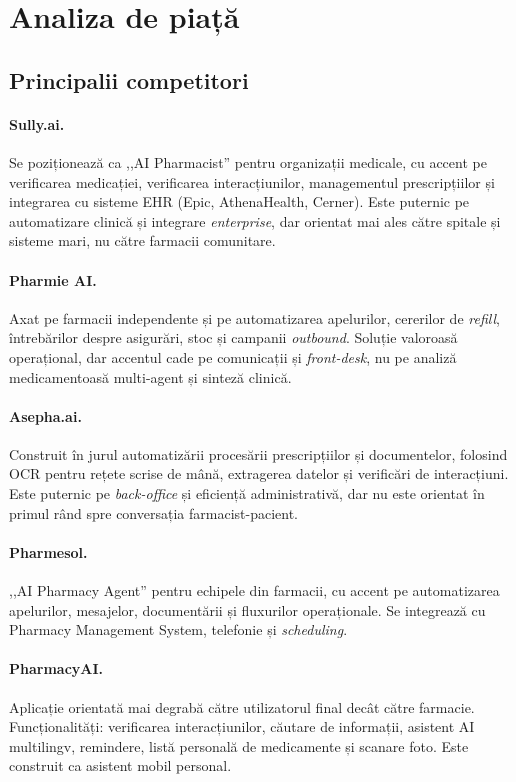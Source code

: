 \section{Analiza de piață}

\subsection{Principalii competitori}

\paragraph{Sully.ai.} Se poziționează ca ,,AI Pharmacist'' pentru organizații medicale, cu accent pe verificarea medicației, verificarea interacțiunilor, managementul prescripțiilor și integrarea cu sisteme EHR (Epic, AthenaHealth, Cerner). Este puternic pe automatizare clinică și integrare \textit{enterprise}, dar orientat mai ales către spitale și sisteme mari, nu către farmacii comunitare.

\paragraph{Pharmie AI.} Axat pe farmacii independente și pe automatizarea apelurilor, cererilor de \textit{refill}, întrebărilor despre asigurări, stoc și campanii \textit{outbound}. Soluție valoroasă operațional, dar accentul cade pe comunicații și \textit{front-desk}, nu pe analiză medicamentoasă multi-agent și sinteză clinică.

\paragraph{Asepha.ai.} Construit în jurul automatizării procesării prescripțiilor și documentelor, folosind OCR pentru rețete scrise de mână, extragerea datelor și verificări de interacțiuni. Este puternic pe \textit{back-office} și eficiență administrativă, dar nu este orientat în primul rând spre conversația farmacist-pacient.

\paragraph{Pharmesol.} ,,AI Pharmacy Agent'' pentru echipele din farmacii, cu accent pe automatizarea apelurilor, mesajelor, documentării și fluxurilor operaționale. Se integrează cu Pharmacy Management System, telefonie și \textit{scheduling}.

\paragraph{PharmacyAI.} Aplicație orientată mai degrabă către utilizatorul final decât către farmacie. Funcționalități: verificarea interacțiunilor, căutare de informații, asistent AI multilingv, remindere, listă personală de medicamente și scanare foto. Este construit ca asistent mobil personal.

